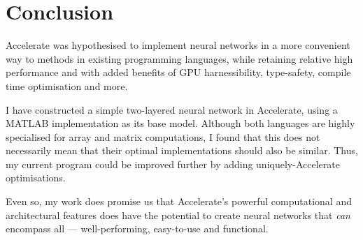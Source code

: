 \chapter{Conclusion}\label{ch:conclusion}

Accelerate was hypothesised to implement neural networks in a more convenient way to methods in existing programming languages, while retaining relative high performance and with added benefits of GPU harnessibility, type-safety, compile time optimisation and more.

I have constructed a simple two-layered neural network in Accelerate, using a MATLAB implementation as its base model. Although both languages are highly specialised for array and matrix computations, I found that this does not necessarily mean that their optimal implementations should also be similar. Thus, my current program could be improved further by adding uniquely-Accelerate optimisations. 

Even so, my work does promise us that Accelerate's powerful computational and architectural features does have the potential to create neural networks that \textit{can} encompass all --- well-performing, easy-to-use and functional.